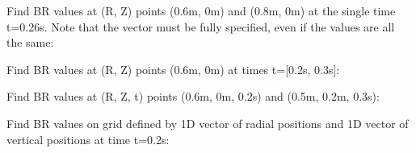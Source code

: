 \documentclass[letterpaper,10pt,english]{sphinxmanual}
\begin{document}
\begin{fulllineitems}
\begin{fulllineitems}
\begin{sphinxVerbatim}[commandchars=\\\{\}]
    
\end{sphinxVerbatim}

Find BR values at (R, Z) points (0.6m, 0m) and (0.8m, 0m) at the
single time t=0.26s. Note that the  vector must be fully
specified, even if the values are all the same:

\begin{sphinxVerbatim}[commandchars=\\\{\}]
  \PYG{p}{[} \PYG{p}{]} \PYG{p}{[} \PYG{p}{]} 
\end{sphinxVerbatim}

Find BR values at (R, Z) points (0.6m, 0m) at times t={[}0.2s, 0.3s{]}:

\begin{sphinxVerbatim}[commandchars=\\\{\}]
    \PYG{p}{[} \PYG{p}{]}
\end{sphinxVerbatim}

Find BR values at (R, Z, t) points (0.6m, 0m, 0.2s) and
(0.5m, 0.2m, 0.3s):

\begin{sphinxVerbatim}[commandchars=\\\{\}]
  \PYG{p}{[} \PYG{p}{]} \PYG{p}{[} \PYG{p}{]} \PYG{p}{[} \PYG{p}{]} 
\end{sphinxVerbatim}

Find BR values on grid defined by 1D vector of radial positions 
and 1D vector of vertical positions  at time t=0.2s:


\end{fulllineitems}
\end{fulllineitems}
\end{document}
